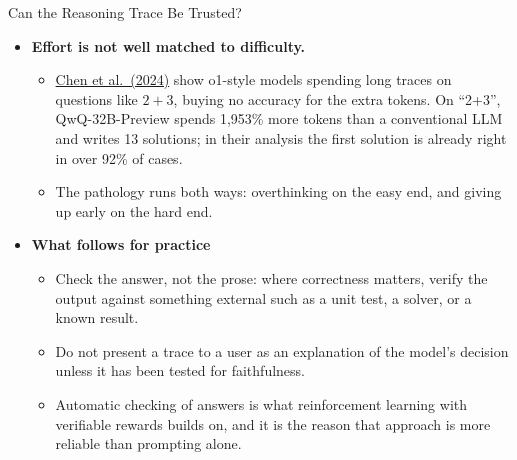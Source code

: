 \begin{frame}[allowframebreaks]{Can the Reasoning Trace Be Trusted?}
\begin{itemize}
\begin{itemize}
        \end{itemize}
    \framebreak
        \item \textbf{Effort is not well matched to difficulty.}
        \begin{itemize}
            \item \href{https://arxiv.org/abs/2412.21187}{Chen et al.\ (2024)} show o1-style models spending long traces on questions like $2+3$, buying no accuracy for the extra tokens. On ``2+3'', QwQ-32B-Preview spends 1,953\% more tokens than a conventional LLM and writes 13 solutions; in their analysis the first solution is already right in over 92\% of cases.
            \item The pathology runs both ways: overthinking on the easy end, and giving up early on the hard end.
        \end{itemize}
        \item \textbf{What follows for practice}
        \begin{itemize}
            \item Check the answer, not the prose: where correctness matters, verify the output against something external such as a unit test, a solver, or a known result.
            \item Do not present a trace to a user as an explanation of the model's decision unless it has been tested for faithfulness.
            \item Automatic checking of answers is what reinforcement learning with verifiable rewards builds on, and it is the reason that approach is more reliable than prompting alone.
        \end{itemize}
    \end{itemize}
\end{frame}
